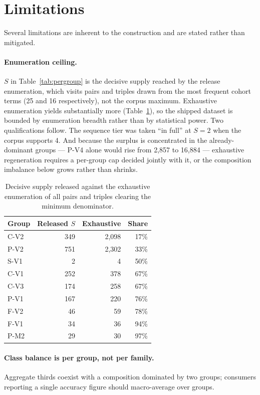 \section{Limitations}
\label{sec:limitations}

Several limitations are inherent to the construction and are stated rather than
mitigated.

\paragraph{Enumeration ceiling.} $S$ in Table~\ref{tab:pergroup} is the decisive
supply reached by the release enumeration, which visits pairs and triples drawn
from the most frequent cohort terms (25 and 16 respectively), not the corpus
maximum. Exhaustive enumeration yields substantially more
(Table~\ref{tab:ceiling}), so the shipped dataset is bounded by enumeration
breadth rather than by statistical power. Two qualifications follow. The
sequence tier was taken ``in full'' at $S = 2$ when the corpus supports 4.
And because the surplus is concentrated in the already-dominant groups --- P-V4
alone would rise from 2{,}857 to 16{,}884 --- exhaustive regeneration requires a
per-group cap decided jointly with it, or the composition imbalance below grows
rather than shrinks.

\begin{table}[t]
\centering
\small
\begin{tabular}{lrrr}
\toprule
Group & Released $S$ & Exhaustive & Share \\
\midrule
C-V2 & 349 & 2{,}098 & 17\% \\
P-V2 & 751 & 2{,}302 & 33\% \\
S-V1 & 2 & 4 & 50\% \\
C-V1 & 252 & 378 & 67\% \\
C-V3 & 174 & 258 & 67\% \\
P-V1 & 167 & 220 & 76\% \\
F-V2 & 46 & 59 & 78\% \\
F-V1 & 34 & 36 & 94\% \\
P-M2 & 29 & 30 & 97\% \\
\bottomrule
\end{tabular}
\caption{Decisive supply released against the exhaustive enumeration of all
pairs and triples clearing the minimum denominator.}
\label{tab:ceiling}
\end{table}

\paragraph{Class balance is per group, not per family.} Aggregate thirds coexist
with a composition dominated by two groups; consumers reporting a single accuracy
figure should macro-average over groups.

